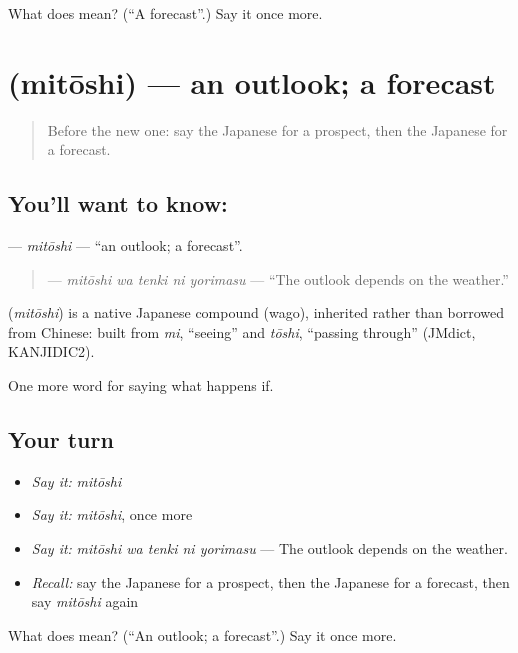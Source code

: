 \begin{tcolorbox}[breakable,colback=teal!4,colframe=teal!35!black,title={Before you move on}]
What does  mean? (\textquotedblleft{}A forecast\textquotedblright{}.) Say it once more.
\end{tcolorbox}
\section[\texorpdfstring{\ja{みとおし} (mitōshi)}{みとおし (mitōshi)}]{ (mitōshi) — an outlook; a forecast}

\label{lesson:JA-C514-mitoushi}



\begin{quote}
Before the new one: say the Japanese for a prospect, then the Japanese for a forecast.
\end{quote}

\subsection*{You'll want to know: }
\textbf{} — \emph{mitōshi} — \textquotedblleft{}an outlook; a forecast\textquotedblright{}.

\begin{quote}
\textbf{  } — \emph{mitōshi wa tenki ni yorimasu} — \textquotedblleft{}The outlook depends on the weather.\textquotedblright{}
\end{quote}

\begin{cousinweb}
\textbf{} (\emph{mitōshi}) is a native Japanese compound (wago), inherited rather than borrowed from Chinese: built from \emph{mi}, \textquotedblleft{}seeing\textquotedblright{} and \emph{tōshi}, \textquotedblleft{}passing through\textquotedblright{} (JMdict, KANJIDIC2).
\end{cousinweb}

\begin{grammarlens}[title={What you've built}]
One more word for saying what happens if.
\end{grammarlens}

\subsection*{Your turn}
\begin{itemize}
\raggedright
  \item \emph{Say it:} \emph{mitōshi}
  \item \emph{Say it:} \emph{mitōshi}, once more
  \item \emph{Say it:} \emph{mitōshi wa tenki ni yorimasu} — The outlook depends on the weather.
  \item \emph{Recall:} say the Japanese for a prospect, then the Japanese for a forecast, then say \emph{mitōshi} again
\end{itemize}

\begin{tcolorbox}[breakable,colback=teal!4,colframe=teal!35!black,title={Before you move on}]
What does  mean? (\textquotedblleft{}An outlook; a forecast\textquotedblright{}.) Say it once more.
\end{tcolorbox}
